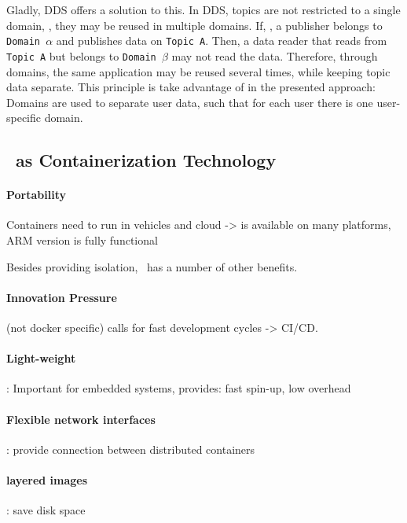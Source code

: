 Gladly, DDS offers a solution to this. In DDS, topics are not restricted to a single domain, \ie , they may be reused in multiple domains. If, \eg , a publisher belongs to \texttt{Domain $\alpha$} and publishes data on \texttt{Topic A}. Then, a data reader that reads from \texttt{Topic A} but belongs to \texttt{Domain $\beta$} may not read the data. Therefore, through domains, the same application may be reused several times, while keeping topic data separate. This principle is take advantage of in the presented approach: Domains are used to separate user data, such that for each user there is one user-specific domain.




\subsection{\docker\ as Containerization Technology}

\paragraph{Portability} Containers need to run in vehicles and cloud -> \docker is available on many platforms, ARM version is fully functional

Besides providing isolation, \docker\ has a number of other benefits. 
\paragraph{Innovation Pressure}(not docker specific) calls for fast development cycles -> CI/CD.

\paragraph{Light-weight}: Important for embedded systems, provides: fast spin-up, low overhead

\paragraph{Flexible network interfaces}: provide connection between distributed containers

\paragraph{layered images}: save disk space


